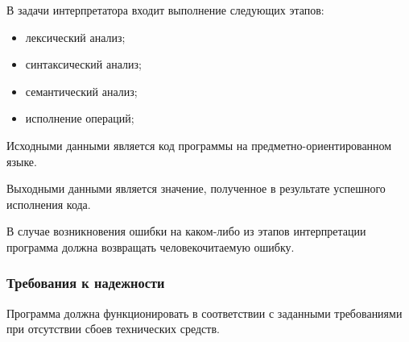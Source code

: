 В задачи интерпретатора входит выполнение следующих этапов:
\begin{itemize}
	\item лексический анализ;
	\item синтаксический анализ;
	\item семантический анализ;
	\item исполнение операций;
\end{itemize}

Исходными данными является код программы на предметно-ориентированном языке.

Выходными данными является значение, полученное в результате успешного исполнения кода.

В случае возникновения ошибки на каком-либо из этапов интерпретации программа должна возвращать человекочитаемую ошибку.



\subsubsection{Требования к надежности}

Программа должна функционировать в соответствии с заданными требованиями при отсутствии сбоев технических средств.
